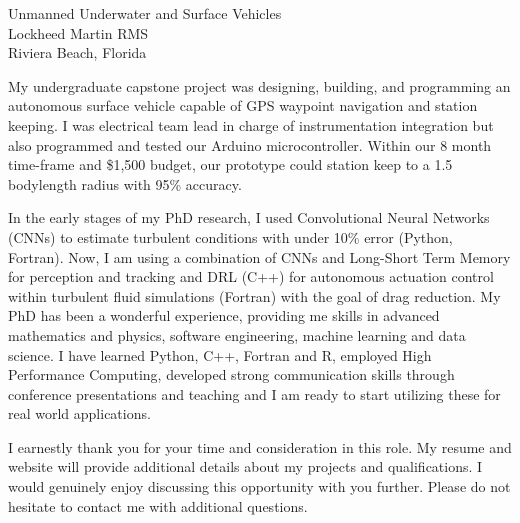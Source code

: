 \documentclass[11pt]{letter} %
\begin{document}
\begin{letter}{Unmanned Underwater and Surface Vehicles \\
Lockheed Martin RMS \\
Riviera Beach, Florida
}

My undergraduate capstone project was designing, building, and programming an autonomous surface vehicle capable of GPS waypoint navigation and station keeping. I was electrical team lead in charge of instrumentation integration but also programmed and tested our Arduino microcontroller. Within our 8 month time-frame and \$1,500 budget, our prototype could station keep to a 1.5 bodylength radius with 95\% accuracy. 

In the early stages of my PhD research, I used Convolutional Neural Networks (CNNs) to estimate turbulent conditions with under 10\% error (Python, Fortran). Now, I am using a combination of CNNs and Long-Short Term Memory for perception and tracking and DRL (C++) for autonomous actuation control within turbulent fluid simulations (Fortran) with the goal of drag reduction. My PhD has been a wonderful experience, providing me skills in advanced mathematics and physics, software engineering, machine learning and data science. I have learned Python, C++, Fortran and R, employed High Performance Computing, developed strong communication skills through conference presentations and teaching and I am ready to start utilizing these for real world applications. 
 

I earnestly thank you for your time and consideration in this role. My resume and website will provide additional details about my projects and qualifications. I would genuinely enjoy discussing this opportunity with you further. Please do not hesitate to contact me with additional questions.


\end{letter}
\end{document}
